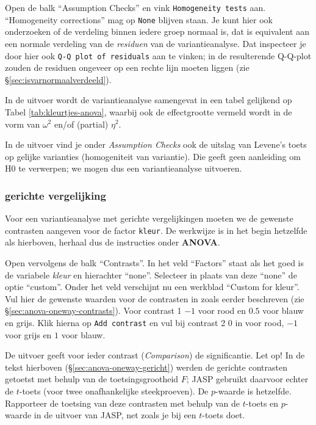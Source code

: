 \documentclass[
]{book}
\begin{document}
Open de balk ``Assumption Checks'' en vink \texttt{Homogeneity\ tests} aan. ``Homogeneity corrections'' mag op \texttt{None} blijven staan. Je kunt hier ook onderzoeken of de verdeling binnen iedere groep normaal is, dat is equivalent aan een normale verdeling van de \emph{residuen} van de variantieanalyse. Dat inspecteer je door hier ook \texttt{Q-Q\ plot\ of\ residuals} aan te vinken; in de resulterende Q-Q-plot zouden de residuen ongeveer op een rechte lijn moeten liggen (zie §\ref{sec:isvarnormaalverdeeld}).

In de uitvoer wordt de variantieanalyse samengevat in een tabel gelijkend op Tabel \ref{tab:kleurtjes-anova}, waarbij ook de effectgrootte vermeld wordt in de vorm van \(\omega^2\) en/of (partial) \(\eta^2\).

In de uitvoer vind je onder \emph{Assumption Checks} ook de uitslag van Levene's toets op gelijke
varianties (homogeniteit van variantie). Die geeft geen aanleiding om H0
te verwerpen; we mogen dus een variantieanalyse uitvoeren.

\hypertarget{gerichte-vergelijking-1}{%
\subsubsection{gerichte vergelijking}\label{gerichte-vergelijking-1}}

Voor een variantieanalyse met gerichte vergelijkingen moeten we de
gewenste contrasten aangeven voor de factor \texttt{kleur}. De werkwijze is in het begin
hetzelfde als hierboven, herhaal dus de instructies onder \textbf{ANOVA}.

Open vervolgens de balk ``Contrasts''. In het veld ``Factors'' staat als het goed is de variabele \emph{kleur} en hierachter ``none''. Selecteer in plaats van deze ``none'' de optie ``custom''. Onder het veld verschijnt nu een werkblad ``Custom for kleur''. Vul hier de gewenste waarden voor de contrasten in zoals eerder beschreven (zie §\ref{sec:anova-oneway-contrasts}). Voor contrast 1 \(-1\) voor rood en \(0.5\) voor blauw en grijs. Klik hierna op \texttt{Add\ contrast} en vul bij contrast 2 \(0\) in voor rood, \(-1\) voor grijs en \(1\) voor blauw.

De uitvoer geeft voor ieder contrast (\emph{Comparison}) de significantie. Let op!
In de tekst hierboven (§\ref{sec:anova-oneway-gericht}) werden de gerichte contrasten getoetst met behulp van de toetsingsgrootheid \(F\);
JASP gebruikt daarvoor echter de \(t\)-toets (voor twee onafhankelijke steekproeven). De \(p\)-waarde is hetzelfde. Rapporteer de toetsing van deze contrasten met behulp van de \(t\)-toets en \(p\)-waarde in de uitvoer van JASP, net zoals je bij een \(t\)-toets doet.
\end{document}
